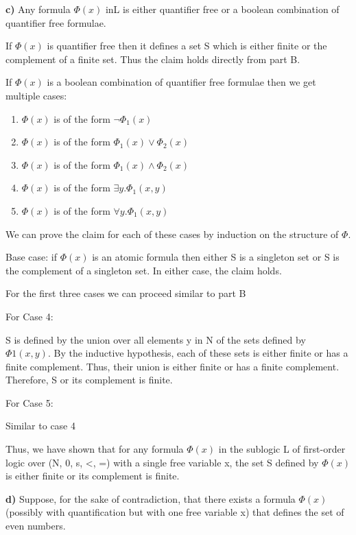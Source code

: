 \documentclass{article}
\begin{document}
\noindent \textbf{c)} Any formula $\Phi(x)$ inL is either quantifier free or a boolean combination of quantifier free formulae. 

If $\Phi(x)$ is quantifier free then it defines a set S which is either finite or the complement of a finite set. Thus the claim holds directly from part B.

If $\Phi(x)$ is a boolean combination of quantifier free formulae then we get multiple cases:

\begin{enumerate}
    \item $\Phi(x)$ is of the form $\neg \Phi_1(x)$
    \item $\Phi(x)$ is of the form $\Phi_1(x) \lor \Phi_2(x)$
    \item $\Phi(x)$ is of the form $\Phi_1(x) \land \Phi_2(x)$
    \item $\Phi(x)$ is of the form $\exists y. \Phi_1(x,y)$
    \item  $\Phi(x)$ is of the form $\forall y. \Phi_1(x,y)$
\end{enumerate}

We can prove the claim for each of these cases by induction on the structure of $\Phi$.

Base case: if $\Phi (x)$ is an atomic formula then either S is a singleton set or S is the complement of a singleton set. In either case, the claim holds.



For the first three cases we can proceed similar to part B

For Case 4:

S is defined by the union over all elements y in N of the sets defined by $\Phi 1(x,y)$. By the inductive hypothesis, each of these sets is either finite or has a finite complement. Thus, their union is either finite or has a finite complement. Therefore, S or its complement is finite.

For Case 5:

Similar to case 4

Thus, we have shown that for any formula $\Phi (x)$ in the sublogic L of first-order logic over (N, 0, s, <, =) with a single free variable x, the set S defined by $\Phi(x)$ is either finite or its complement is finite.

\noindent \textbf{d)} Suppose, for the sake of contradiction, that there exists a formula $\Phi (x)$ (possibly with quantification but with one free variable x) that defines the set of even numbers.
\end{document}
